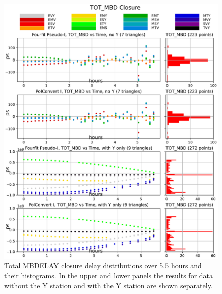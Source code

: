\documentclass[letterpaper,twoside,12pt]{article}
\begin{document}
\begin{figure}[ht!]
  \begin{center}
  \includegraphics[width=40pc]{TOT_MBD_Closure_Delay_Y_no_Y.pdf}
  \caption{\small Total MBDELAY closure delay distributions over 5.5 hours and their histograms. In the upper and lower panels the results for data without the Y station and with the Y station are shown separately.}
  \label{tot_mbd}
  \end{center}
\end{figure}
\end{document}
